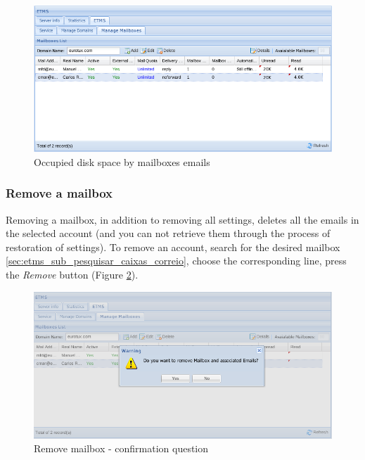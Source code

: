 \begin{figure}[H]
    \begin{center}
    \includegraphics[scale=0.45]{screenshots/etms/etms_mb_space.png}
    \caption{Occupied disk space by mailboxes emails}
    \label{fig:etms_mb_space}
    \end{center}
\end{figure}



\subsubsection{Remove a mailbox}
\label{sec:etms_sub_apagar_caixas_correio}
Removing a mailbox, in addition to removing all settings, deletes all the emails in the selected account (and you can not retrieve them through the process of restoration of settings). To remove an account, search for the desired mailbox \ref{sec:etms_sub_pesquisar_caixas_correio}, choose the corresponding line, press the \textit{Remove} button (Figure \ref{fig:etms_mb_del}).

\begin{figure}[H]
    \begin{center}
    \includegraphics[scale=0.6]{screenshots/etms/etms_mb_del.png}
    \caption{Remove mailbox - confirmation question}
    \label{fig:etms_mb_del}
    \end{center}
\end{figure}
